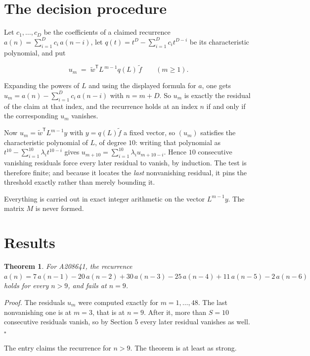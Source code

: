 \documentclass[11pt]{article}
\newtheorem{theorem}{Theorem}
\theoremstyle{definition}
\begin{document}
\section{The decision procedure}

Let $c_1,\dots,c_D$ be the coefficients of a claimed recurrence $a(n) = \sum_{i=1}^{D} c_i\,a(n-i)$, let $q(t) = t^{D} - \sum_{i=1}^{D} c_i t^{D-i}$ be its characteristic polynomial, and put

\[u_m \;=\; \tilde w^{\mathsf T} L^{\,m-1} q(L)\,\tilde f \qquad (m \ge 1).\]

Expanding the powers of $L$ and using the displayed formula for $a$, one gets $u_m = a(n) - \sum_{i=1}^{D} c_i\,a(n-i)$ with $n = m + D$. So $u_m$ is exactly the residual of the claim at that index, and the recurrence holds at an index $n$ if and only if the corresponding $u_m$ vanishes.

Now $u_m = \tilde w^{\mathsf T} L^{m-1} y$ with $y = q(L)\tilde f$ a fixed vector, so $(u_m)$ satisfies the characteristic polynomial of $L$, of degree $10$: writing that polynomial as $t^{10} - \sum_{i=1}^{10} \lambda_i t^{10-i}$ gives $u_{m+10} = \sum_{i=1}^{10} \lambda_i u_{m+10-i}$. Hence $10$ consecutive vanishing residuals force every later residual to vanish, by induction. The test is therefore finite; and because it locates the {\itshape last} nonvanishing residual, it pins the threshold exactly rather than merely bounding it.

Everything is carried out in exact integer arithmetic on the vector $L^{m-1}y$. The matrix $M$ is never formed.

\section{Results}

\begin{theorem} For A208641, the recurrence $a(n) = 7\,a(n-1) - 20\,a(n-2) + 30\,a(n-3) - 25\,a(n-4) + 11\,a(n-5) - 2\,a(n-6)$ holds for every $n > 9$, and fails at $n = 9$.\end{theorem}

{\itshape Proof.} The residuals $u_m$ were computed exactly for $m = 1,\dots,48$. The last nonvanishing one is at $m = 3$, that is at $n = 9$. After it, more than $S = 10$ consecutive residuals vanish, so by Section 5 every later residual vanishes as well. $\square$

The entry claims the recurrence for $n > 9$. The theorem is at least as strong.
\end{document}
